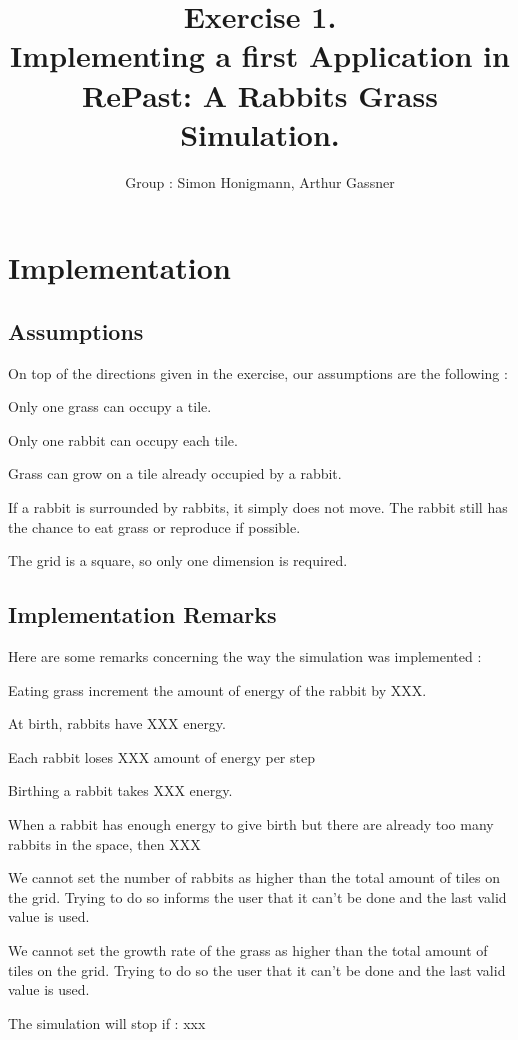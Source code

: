 \documentclass[11pt]{article}
\title{\bf Exercise 1.\\ Implementing a first Application in RePast: A Rabbits Grass Simulation.}
\author{Group \textnumero76: Simon Honigmann, Arthur Gassner}
\begin{document}
\maketitle

\section{Implementation}

\subsection{Assumptions}
On top of the directions given in the exercise, our assumptions are the following :\\

\begin{compactenum} 
	\item Only one grass can occupy a tile.
	\item Only one rabbit can occupy each tile.
	\item Grass can grow on a tile already occupied by a rabbit.
	\item If a rabbit is surrounded by rabbits, it simply does not move. The rabbit still has the chance to eat grass or reproduce if possible.
	\item The grid is a square, so only one dimension is required.
\end{compactenum}

\subsection{Implementation Remarks}
Here are some remarks concerning the way the simulation was implemented :\\

\begin{compactenum}
	\item Eating grass increment the amount of energy of the rabbit by XXX.
	\item At birth, rabbits have XXX energy.
	\item Each rabbit loses XXX amount of energy per step
	\item Birthing a rabbit takes XXX energy.
	\item When a rabbit has enough energy to give birth but there are already too many rabbits in the space, then XXX
	\item We cannot set the number of rabbits as higher than the total amount of tiles on the grid. Trying to do so informs the user that it can't be done and the last valid value is used.
	\item We cannot set the growth rate of the grass as higher than the total amount of tiles on the grid. Trying to do so the user that it can't be done and the last valid value is used.	
	\item The simulation will stop if : xxx
\end{compactenum}
\end{document}
